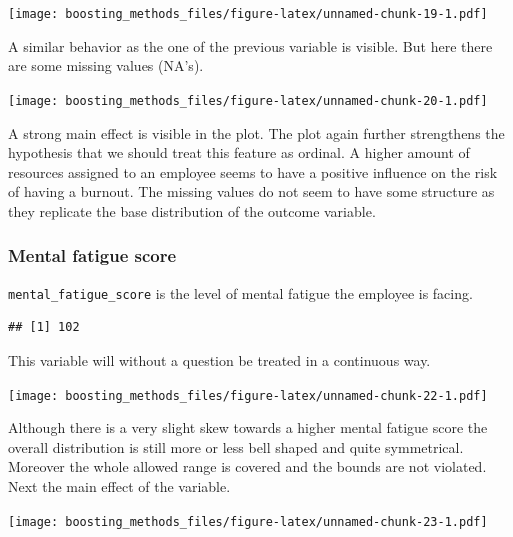 \documentclass[
]{book}
\newenvironment{Shaded}{\begin{snugshade}}{\end{snugshade}}
\newcommand{\CommentTok}[1]{\textcolor[rgb]{0.56,0.35,0.01}{\textit{#1}}}
\newcommand{\FunctionTok}[1]{\textcolor[rgb]{0.00,0.00,0.00}{#1}}
\newcommand{\NormalTok}[1]{#1}
\newcommand{\SpecialCharTok}[1]{\textcolor[rgb]{0.00,0.00,0.00}{#1}}
\begin{document}
\texttt{[image: boosting\_methods\_files/figure-latex/unnamed-chunk-19-1.pdf]}

A similar behavior as the one of the previous variable is visible. But here there are some missing values (NA's).

\texttt{[image: boosting\_methods\_files/figure-latex/unnamed-chunk-20-1.pdf]}

A strong main effect is visible in the plot. The plot again further strengthens the hypothesis that we should treat this feature as ordinal. A higher amount of resources assigned to an employee seems to have a positive influence on the risk of having a burnout. The missing values do not seem to have some structure as they replicate the base distribution of the outcome variable.

\hypertarget{mental-fatigue-score}{%
\subsubsection{Mental fatigue score}\label{mental-fatigue-score}}

\texttt{mental\_fatigue\_score} is the level of mental fatigue the employee is facing.

\begin{Shaded}
\end{Shaded}

\begin{verbatim}
## [1] 102
\end{verbatim}

This variable will without a question be treated in a continuous way.

\texttt{[image: boosting\_methods\_files/figure-latex/unnamed-chunk-22-1.pdf]}

Although there is a very slight skew towards a higher mental fatigue score the overall distribution is still more or less bell shaped and quite symmetrical. Moreover the whole allowed range is covered and the bounds are not violated. Next the main effect of the variable.

\texttt{[image: boosting\_methods\_files/figure-latex/unnamed-chunk-23-1.pdf]}
\end{document}
